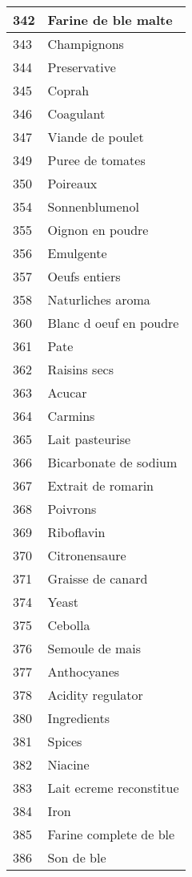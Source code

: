 \begin{longtable}{|l|l|}
342 & Farine de ble malte \\ \hline 
343 & Champignons \\ \hline 
344 & Preservative \\ \hline 
345 & Coprah \\ \hline 
346 & Coagulant \\ \hline 
347 & Viande de poulet \\ \hline 
349 & Puree de tomates \\ \hline 
350 & Poireaux \\ \hline 
354 & Sonnenblumenol \\ \hline 
355 & Oignon en poudre \\ \hline 
356 & Emulgente \\ \hline 
357 & Oeufs entiers \\ \hline 
358 & Naturliches aroma \\ \hline 
360 & Blanc d oeuf en poudre \\ \hline 
361 & Pate \\ \hline 
362 & Raisins secs \\ \hline 
363 & Acucar \\ \hline 
364 & Carmins \\ \hline 
365 & Lait pasteurise \\ \hline 
366 & Bicarbonate de sodium \\ \hline 
367 & Extrait de romarin \\ \hline 
368 & Poivrons \\ \hline 
369 & Riboflavin \\ \hline 
370 & Citronensaure \\ \hline 
371 & Graisse de canard \\ \hline 
374 & Yeast \\ \hline 
375 & Cebolla \\ \hline 
376 & Semoule de mais \\ \hline 
377 & Anthocyanes \\ \hline 
378 & Acidity regulator \\ \hline 
380 & Ingredients \\ \hline 
381 & Spices \\ \hline 
382 & Niacine \\ \hline 
383 & Lait ecreme reconstitue \\ \hline 
384 & Iron \\ \hline 
385 & Farine complete de ble \\ \hline 
386 & Son de ble \\ \hline 

\end{longtable}
